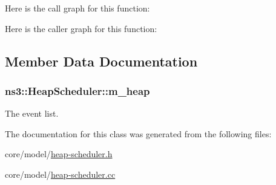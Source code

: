 Here is the call graph for this function\+:




Here is the caller graph for this function\+:




\subsection{Member Data Documentation}
\subsubsection[{\texorpdfstring{m\+\_\+heap}{m_heap}}]{ ns3\+::\+Heap\+Scheduler\+::m\+\_\+heap\hspace{0.3cm}{\ttfamily [private]}}\hypertarget{classns3_1_1HeapScheduler_a2c9f37bd4c53d3bd08147bfd8734f7da}{}\label{classns3_1_1HeapScheduler_a2c9f37bd4c53d3bd08147bfd8734f7da}
The event list. 

The documentation for this class was generated from the following files\+:\begin{DoxyCompactItemize}
\item 
core/model/\hyperlink{heap-scheduler_8h}{heap-\/scheduler.\+h}\item 
core/model/\hyperlink{heap-scheduler_8cc}{heap-\/scheduler.\+cc}\end{DoxyCompactItemize}
